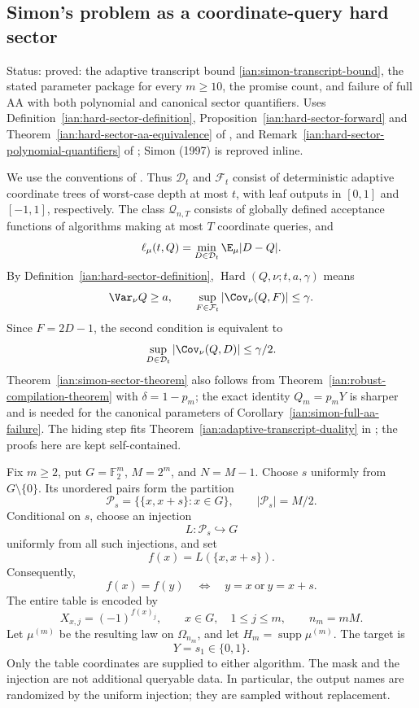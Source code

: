 \subsection{Simon's problem as a coordinate-query hard sector}\label{ian:simon-sector}

Status: proved: the adaptive transcript bound \eqref{ian:simon-transcript-bound}, the stated parameter package for every \(m\ge10\), the promise count, and failure of full AA with both polynomial and canonical sector quantifiers. Uses Definition~\ref{ian:hard-sector-definition}, Proposition~\ref{ian:hard-sector-forward} and Theorem~\ref{ian:hard-sector-aa-equivalence} of , and Remark~\ref{ian:hard-sector-polynomial-quantifiers} of ; Simon (1997) is reproved inline.

We use the conventions of .
Thus \(\mathcal D_t\) and \(\mathcal F_t\) consist of deterministic adaptive coordinate trees of worst-case depth at most \(t\), with leaf outputs in \([0,1]\) and \([-1,1]\), respectively. The class \(\mathcal Q_{n,T}\) consists of globally defined acceptance functions of algorithms making at most \(T\) coordinate queries, and
\[
 \ell_\mu(t,Q)=\min_{D\in\mathcal D_t}\E_\mu|D-Q|.
\]
By Definition~\ref{ian:hard-sector-definition},
\(\operatorname{Hard}(Q,\nu;t,a,\gamma)\) means
\[
 \Var_\nu Q\ge a,
 \qquad
 \sup_{F\in\mathcal F_t}|\Cov_\nu(Q,F)|\le\gamma.
\]
Since \(F=2D-1\), the second condition is equivalent to
\[
 \sup_{D\in\mathcal D_t}|\Cov_\nu(Q,D)|\le\gamma/2.
\]
Theorem~\ref{ian:simon-sector-theorem} also follows from Theorem~\ref{ian:robust-compilation-theorem} with \(\delta=1-p_m\); the exact identity \(Q_m=p_mY\) is sharper and is needed for the canonical parameters of Corollary~\ref{ian:simon-full-aa-failure}. The hiding step fits Theorem~\ref{ian:adaptive-transcript-duality} in ; the proofs here are kept self-contained.

\begin{definition}\label{ian:simon-law}
Fix \(m\ge2\), put \(G=\mathbb F_2^m\), \(M=2^m\), and \(N=M-1\).
Choose \(s\) uniformly from \(G\setminus\{0\}\). Its unordered pairs form the partition
\[
 \mathcal P_s=\bigl\{\{x,x+s\}:x\in G\bigr\},
 \qquad |\mathcal P_s|=M/2.
\]
Conditional on \(s\), choose an injection
\[
 L:\mathcal P_s\hookrightarrow G
\]
uniformly from all such injections, and set
\[
 f(x)=L(\{x,x+s\}).
\]
Consequently,
\[
 f(x)=f(y)
 \quad\Longleftrightarrow\quad
 y=x\ \text{or}\ y=x+s.
\]
The entire table is encoded by
\[
 X_{x,j}=(-1)^{f(x)_j},
 \qquad x\in G,\quad 1\le j\le m,
 \qquad n_m=mM.
\]
Let \(\mu^{(m)}\) be the resulting law on \(\Omega_{n_m}\), and let
\(H_m=\operatorname{supp}\mu^{(m)}\).
The target is
\[
 Y=s_1\in\{0,1\}.
\]
Only the table coordinates are supplied to either algorithm. The mask and the injection are not additional queryable data. In particular, the output names are randomized by the uniform injection; they are sampled without replacement.
\end{definition}

